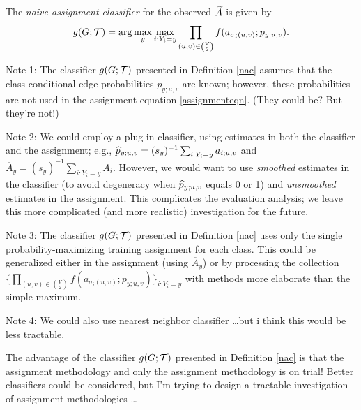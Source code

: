 \label{nac}
The {\em naive assignment classifier} for the observed $\widetilde{A}$ is given by
\begin{eqnarray}
g(G;\mathcal{T}) = {\arg\max_y \max_{i:Y_i=y} \prod_{(u,v) \in {V \choose 2}} f(a_{\sigma_i(u,v)};p_{y;u,v})}.
\end{eqnarray}

Note 1:
The classifier $g(G;\mathcal{T})$ presented in Definition \ref{nac}
assumes that the class-conditional edge probabilities $p_{y;u,v}$ are known;
however, these probabilities are not used in the assignment equation \ref{assignmenteqn}.
(They could be? But they're not!)

Note 2:
We could employ a plug-in classifier,
using estimates in both the classifier and the assignment;
e.g., $\widehat{p}_{y;u,v} = (s_y)^{-1} \sum_{i:Y_i=y} a_{i;u,v}$
and $\overline{A}_y = (s_y)^{-1} \sum_{i:Y_i=y} A_{i}$.
However, we would want to use {\em smoothed} estimates in the classifier
(to avoid degeneracy when $\widehat{p}_{y;u,v}$ equals 0 or 1)
and {\em unsmoothed} estimates in the assignment.
This complicates the evaluation analysis;
we leave this more complicated (and more realistic) investigation for the future.

Note 3:
The classifier $g(G;\mathcal{T})$ presented in Definition \ref{nac}
uses only the single probability-maximizing training assignment for each class.
This could be generalized either in the assignment (using $\overline{A}_y$)
or by processing the collection
$\{\prod_{(u,v) \in {V \choose 2}} f(a_{\sigma_i(u,v)};p_{y;u,v})\}_{i:Y_i=y}$
with methods more elaborate than the simple maximum.

Note 4:
We could also use nearest neighbor classifier \dots but i think this would be less tractable.

The advantage of the classifier $g(G;\mathcal{T})$ presented in Definition \ref{nac}
is that the assignment methodology and only the assignment methodology is on trial!
Better classifiers could be considered,
but I'm trying to design a tractable investigation of assignment methodologies \dots


